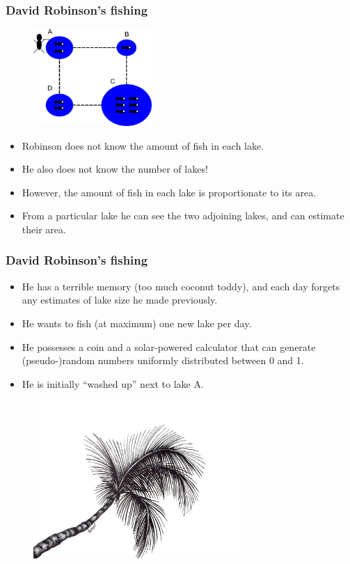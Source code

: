 \documentclass[handout]{beamer}
\begin{document}
\begin{frame}
\frametitle{David Robinson's fishing}

\begin{figure}[ht]
\centerline{\includegraphics[width=0.4\textwidth]{animations_figures/lec4_fishMetropolis.pdf}}
\end{figure}

\begin{itemize}
\item<2-> Robinson does not know the amount of fish in each lake.
\item<3-> He also does not know the number of lakes!
\item<4-> However, the amount of fish in each lake is proportionate to its area.
\item<5-> From a particular lake he can see the two adjoining lakes, and can estimate their area.
\end{itemize}

\end{frame}

\begin{frame}
\frametitle{David Robinson's fishing}

\begin{itemize}
\item<2-> He has a terrible memory (too much coconut toddy), and each day forgets any estimates of lake size he made previously.
\item<3-> He wants to fish (at maximum) one new lake per day.
\item<4-> He possesses a coin and a solar-powered calculator that can generate (pseudo-)random numbers uniformly distributed between 0 and 1.
\item<5-> He is initially ``washed up'' next to lake A.
\end{itemize}

\begin{figure}[ht]
\centerline{\includegraphics[width=0.7\textwidth]{animations_figures/palm.jpg}}
\end{figure}

\end{frame}
\end{document}
